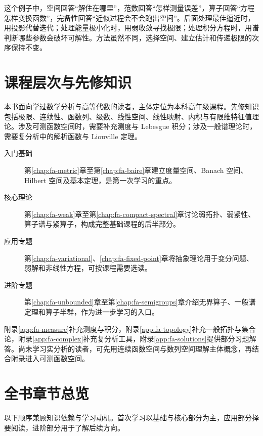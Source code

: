 \documentclass[UTF8,12pt,a4paper,fontset=fandol]{ctexbook}
\begin{document}
这个例子中，空间回答“解住在哪里”，范数回答“怎样测量误差”，算子回答“方程怎样变换函数”，完备性回答“近似过程会不会跑出空间”。后面处理最佳逼近时，用投影代替迭代；处理能量极小化时，用弱收敛寻找极限；处理积分方程时，用谱判断哪些参数会破坏可解性。方法虽然不同，选择空间、建立估计和传递极限的次序保持不变。

\section{课程层次与先修知识}

本书面向学过数学分析与高等代数的读者，主体定位为本科高年级课程。先修知识包括极限、连续性、函数列、级数、线性空间、线性映射、内积与有限维特征值理论。涉及可测函数空间时，需要补充测度与 Lebesgue 积分；涉及一般谱理论时，需要复分析中的解析函数与 Liouville 定理。

\begin{description}
  \item[入门基础] 第\ref{chap:fa-metric}章至第\ref{chap:fa-baire}章建立度量空间、Banach 空间、Hilbert 空间及基本定理，是第一次学习的重点。
  \item[核心理论] 第\ref{chap:fa-weak}章至第\ref{chap:fa-compact-spectral}章讨论弱拓扑、弱紧性、算子谱与紧算子，构成完整基础课程的后半部分。
  \item[应用专题] 第\ref{chap:fa-variational}、\ref{chap:fa-fixed-point}章将抽象理论用于变分问题、弱解和非线性方程，可按课程需要选读。
  \item[进阶专题] 第\ref{chap:fa-unbounded}章至第\ref{chap:fa-semigroups}章介绍无界算子、一般谱定理和算子半群，作为进一步学习的入口。
\end{description}

附录\ref{app:fa-measure}补充测度与积分，附录\ref{app:fa-topology}补充一般拓扑与集合论，附录\ref{app:fa-complex}补充复分析工具，附录\ref{app:fa-solutions}提供部分习题解答。尚未学习实分析的读者，可先用连续函数空间与数列空间理解主体概念，再结合附录进入可测函数空间。

\section{全书章节总览}

以下顺序兼顾知识依赖与学习动机。首次学习以基础与核心部分为主，应用部分择要阅读，进阶部分用于了解后续方向。
\end{document}
